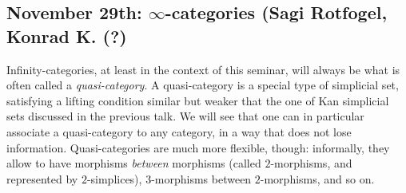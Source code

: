 \documentclass{amsart}
\theoremstyle{definition}
\theoremstyle{remark}
\begin{document}
\subsection{November 29th: $\infty$-categories (Sagi Rotfogel, Konrad K. (?)}

Infinity-categories, at least in the context of this seminar, will always be what is often called a \emph{quasi-category}. A quasi-category is a special type of simplicial set, satisfying a lifting condition similar but weaker that the one of Kan simplicial sets discussed in the previous talk. We will see that one can in particular associate a quasi-category to any category, in a way that does not lose information. Quasi-categories are much more flexible, though: informally, they allow to have morphisms \emph{between} morphisms (called $2$-morphisms, and represented by $2$-simplices), $3$-morphisms between $2$-morphisms, and so on.
\end{document}
